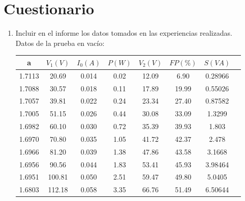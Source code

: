 \section{Cuestionario}
\begin{enumerate}
    \item Incluir en el informe los datos tomados en las experiencias realizadas.\\
    Datos de la prueba en vacío\cite{labo}:
    \begin{center}
        \begin{tabular}{ |c|c|c|c|c|c|c|c| } 
            \hline
            a & $V_{1}(V)$ & $I_{0}(A)$ & $P(W)$ & $V_{2}(V)$ & $FP(\%)$ & $S(VA)$ \\
            \hline
            1.7113 & 20.69 & 0.014 & 0.02 & 12.09 & 6.90 & 0.28966 \\ 
            1.7088 & 30.57 & 0.018 & 0.11 & 17.89 & 19.99 & 0.55026 \\ 
            1.7057 & 39.81 & 0.022 & 0.24 & 23.34 & 27.40 & 0.87582 \\ 
            1.7005 & 51.15 & 0.026 & 0.44 & 30.08 & 33.09 & 1.3299 \\ 
            1.6982 & 60.10 & 0.030 & 0.72 & 35.39 & 39.93 & 1.803 \\ 
            1.6970 & 70.80 & 0.035 & 1.05 & 41.72 & 42.37 & 2.478 \\ 
            1.6966 & 81.20 & 0.039 & 1.38 & 47.86 & 43.58 & 3.1668 \\ 
            1.6956 & 90.56 & 0.044 & 1.83 & 53.41 & 45.93 & 3.98464 \\ 
            1.6951 & 100.81 & 0.050 & 2.51 & 59.47 & 49.80 & 5.0405 \\ 
            1.6803 & 112.18 & 0.058 & 3.35 & 66.76 & 51.49 & 6.50644 \\ 
            \hline
        \end{tabular}
    \end{center}
    

\end{enumerate}
